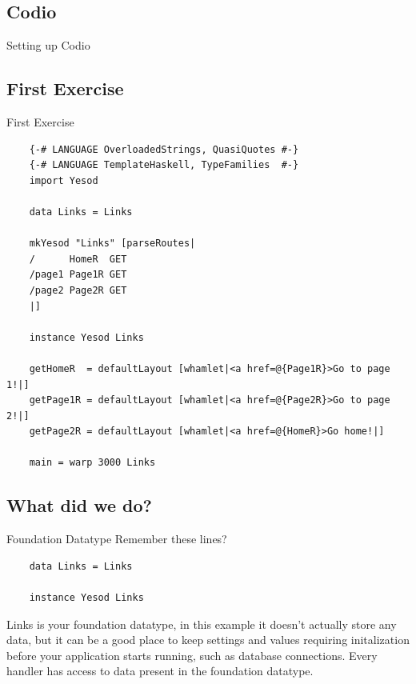 \documentclass[pdf]{beamer}
\begin{document}
\subsection{Codio}
\begin{frame}{Setting up Codio}

\end{frame}

\subsection{First Exercise}
\begin{frame}[fragile]{First Exercise}
  \begin{verbatim}
    {-# LANGUAGE OverloadedStrings, QuasiQuotes #-}
    {-# LANGUAGE TemplateHaskell, TypeFamilies  #-}
    import Yesod

    data Links = Links

    mkYesod "Links" [parseRoutes|
    /      HomeR  GET
    /page1 Page1R GET
    /page2 Page2R GET
    |]

    instance Yesod Links

    getHomeR  = defaultLayout [whamlet|<a href=@{Page1R}>Go to page 1!|]
    getPage1R = defaultLayout [whamlet|<a href=@{Page2R}>Go to page 2!|]
    getPage2R = defaultLayout [whamlet|<a href=@{HomeR}>Go home!|]

    main = warp 3000 Links
  \end{verbatim}
\end{frame}


\subsection{What did we do?}

\begin{frame}[fragile]{Foundation Datatype}
  Remember these lines?
  \begin{verbatim}
    data Links = Links

    instance Yesod Links
  \end{verbatim}
  \pause
  
  Links is your foundation datatype, in this example it doesn't
  actually store any data, but it can be a good place to keep settings
  and values requiring initalization before your application starts
  running, such as database connections. Every handler has access to
  data present in the foundation datatype.
\end{frame}
\end{document}
